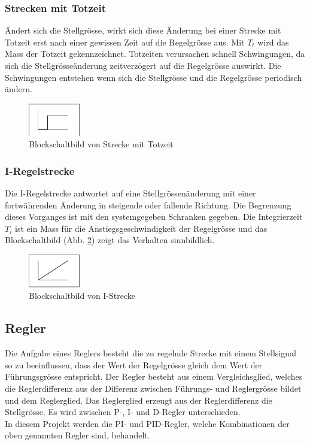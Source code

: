\subsubsection*{Strecken mit Totzeit}
Ändert sich die Stellgrösse, wirkt sich diese Änderung bei einer Strecke mit Totzeit erst nach einer gewissen Zeit auf die Regelgrösse aus. Mit $T_t$ wird das Mass der Totzeit gekennzeichnet.
Totzeiten verursachen schnell Schwingungen, da sich die Stellgrösseänderung zeitverzögert auf die Regelgrösse auswirkt. Die Schwingungen entstehen wenn sich die Stellgrösse und die Regelgrösse periodisch ändern.
\begin{figure}[h!, width=\pagewidth]
\begin{center}
\includegraphics[width=0.2\textwidth]{images/TotZeit}
\caption{Blockschaltbild von Strecke mit Totzeit}
\label{fig:TotZeit}
\end{center}
\end{figure}


\subsubsection*{I-Regelstrecke}
Die I-Regelstrecke antwortet auf eine Stellgrössenänderung mit einer fortwährenden 
Änderung in steigende oder fallende Richtung. Die Begrenzung dieses Vorganges ist mit den systemgegeben Schranken gegeben. Die Integrierzeit $T_i$ ist ein Mass für die Anstiegsgeschwindigkeit der Regelgrösse und das Blockschaltbild (Abb. \ref{fig:IStrecke}) zeigt das Verhalten sinnbildlich.

\begin{figure}[h!, width=\pagewidth]
\begin{center}
\includegraphics[width=0.2\textwidth]{images/IStrecke}
\caption{Blockschaltbild von I-Strecke}
\label{fig:IStrecke}
\end{center}
\end{figure}


\subsection{Regler}
Die Aufgabe eines Reglers besteht die zu regelnde Strecke mit einem Stellsignal so zu beeinflussen, dass der Wert der Regelgrösse gleich dem Wert der Führungsgrösse entspricht. Der Regler besteht aus einem Vergleichsglied, welches die Reglerdifferenz aus der Differenz zwischen Führungs- und Reglergrösse bildet und dem Reglerglied. Das Reglerglied erzeugt aus der Reglerdifferenz die Stellgrösse.
Es wird zwischen P-, I- und D-Regler unterschieden.\\
In diesem Projekt werden die PI- und PID-Regler, welche Kombinationen der oben genannten Regler sind, behandelt.\\

